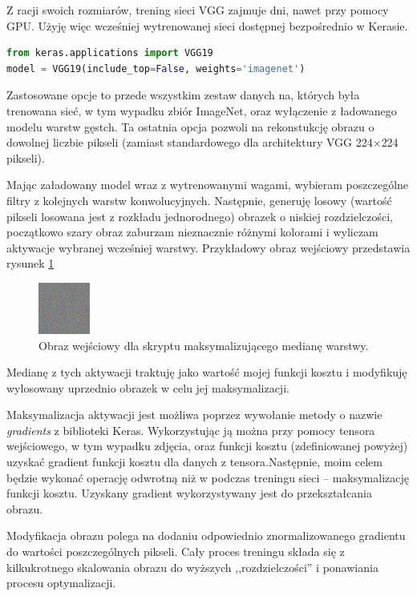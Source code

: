 Z racji swoich rozmiarów, trening sieci VGG zajmuje dni, nawet przy pomocy GPU. Użyję więc wcześniej wytrenowanej sieci dostępnej bezpośrednio w Kerasie.

\label{lst:vggkeras}
\begin{lstlisting}[language=Python, caption={Wczytywanie wag VGG-19 w Keras.}, captionpos=b]
from keras.applications import VGG19
model = VGG19(include_top=False, weights='imagenet')
\end{lstlisting}

Zastosowane opcje to przede wszystkim zestaw danych na, których była trenowana sieć, w tym wypadku zbiór ImageNet\cite{imagenet}, oraz wyłączenie z ładowanego modelu warstw gęstch. Ta ostatnia opcja pozwoli na rekonstukcję obrazu o dowolnej liczbie pikseli (zamiast standardowego dla architektury VGG 224\(\times\)224 pikseli).

Mając załadowany model wraz z wytrenowanymi wagami, wybieram poszczególne filtry z kolejnych warstw konwolucyjnych. Następnie, generuję losowy (wartość pikseli losowana jest z rozkładu jednorodnego) obrazek o niskiej rozdzielczości, początkowo szary obraz zaburzam nieznacznie różnymi kolorami i wyliczam aktywacje wybranej wcześniej warstwy.
Przykładowy obraz wejściowy przedstawia rysunek \ref{fig:obrazwe}

\begin{figure}[ht]
\centerline{\includegraphics[scale=1]{resources/cnn/obrazwe.png}}
\caption{Obraz wejściowy dla skryptu maksymalizującego medianę warstwy.}
\label{fig:obrazwe}
\end{figure}

Medianę z tych aktywacji traktuję jako wartość mojej funkcji kosztu i modyfikuję wylosowany uprzednio obrazek w celu jej maksymalizacji.

Maksymalizacja aktywacji jest możliwa poprzez wywołanie metody o nazwie \textit{gradients} z biblioteki Keras. Wykorzystując ją można przy pomocy tensora wejściowego, w tym wypadku zdjęcia, oraz funkcji kosztu (zdefiniowanej powyżej) uzyskać gradient funkcji kosztu dla danych z tensora.Następnie, moim celem będzie wykonać operację odwrotną niż w podczas treningu sieci -- maksymalizację funkcji kosztu. Uzyskany gradient wykorzystywany jest do przekształcania obrazu.

Modyfikacja obrazu polega na dodaniu odpowiednio znormalizowanego gradientu do wartości poszczególnych pikseli. Cały proces treningu składa się z kilkukrotnego skalowania obrazu do wyższych ,,rozdzielczości'' i ponawiania procesu optymalizacji. 

